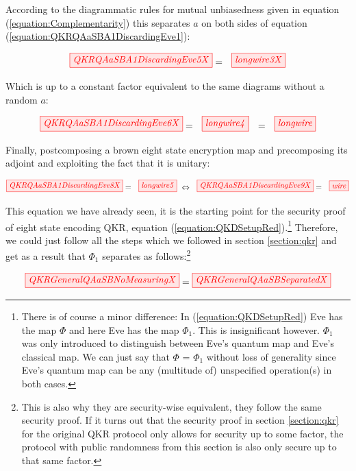 \documentclass[]{article}
\begin{document}
According to the diagrammatic rules for mutual unbiasedness given in equation (\ref{equation:Complementarity}) this separates $a$ on both sides of equation (\ref{equation:QKRQAaSBA1DiscardingEve1}):

\begin{equation}
\label{QKRQAaSBA1DiscardingEve5}
\tikzfig{QKRQAaSBA1DiscardingEve5X} = ~~ \tikzfig{longwire3X}
\end{equation}

Which is up to a constant factor equivalent to the same diagrams without a random $a$:

\begin{equation}
\tikzfig{QKRQAaSBA1DiscardingEve6X} = ~~ \tikzfig{longwire4} ~~ = ~~ \tikzfig{longwire}
\end{equation}

Finally, postcomposing a brown eight state encryption map and precomposing its adjoint and exploiting the fact that it is unitary:

\begin{equation}
\tikzfig{QKRQAaSBA1DiscardingEve8X} = ~~ \tikzfig{longwire5} ~ \Leftrightarrow ~~ \tikzfig{QKRQAaSBA1DiscardingEve9X} = ~~ \tikzfig{wire}
\end{equation}


This equation we have already seen, it is the starting point for the security proof of eight state encoding QKR, equation (\ref{equation:QKDSetupRed}).\footnote{There is of course a minor difference: In (\ref{equation:QKDSetupRed}) Eve has the map $\Phi$ and here Eve has the map $\Phi_1$. This is insignificant however. $\Phi_1$ was only introduced to distinguish between Eve's quantum map and Eve's classical map. We can just say that $\Phi$ = $\Phi_1$ without loss of generality since Eve's quantum map can be any (multitude of) unspecified operation(s) in both cases.} Therefore, we could just follow all the steps which we followed in section \ref{section:qkr} and get as a result that $\Phi_1$ separates as follows:\footnote{This is also why they are security-wise equivalent, they follow the same security proof. If it turns out that the security proof in section \ref{section:qkr} for the original QKR protocol only allows for security up to some factor, the protocol with public randomness from this section is also only secure up to that same factor.}

\begin{equation}
	\label{equation:QKRGeneralSeparation}
	\tikzfig{QKRGeneralQAaSBNoMeasuringX} = \tikzfig{QKRGeneralQAaSBSeparatedX}
\end{equation}
\end{document}
